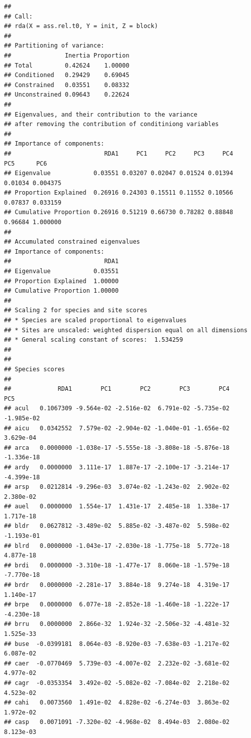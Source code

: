 \documentclass[
]{article}
\begin{document}
\begin{verbatim}
## 
## Call:
## rda(X = ass.rel.t0, Y = init, Z = block) 
## 
## Partitioning of variance:
##               Inertia Proportion
## Total         0.42624    1.00000
## Conditioned   0.29429    0.69045
## Constrained   0.03551    0.08332
## Unconstrained 0.09643    0.22624
## 
## Eigenvalues, and their contribution to the variance 
## after removing the contribution of conditiniong variables
## 
## Importance of components:
##                          RDA1     PC1     PC2     PC3     PC4     PC5      PC6
## Eigenvalue            0.03551 0.03207 0.02047 0.01524 0.01394 0.01034 0.004375
## Proportion Explained  0.26916 0.24303 0.15511 0.11552 0.10566 0.07837 0.033159
## Cumulative Proportion 0.26916 0.51219 0.66730 0.78282 0.88848 0.96684 1.000000
## 
## Accumulated constrained eigenvalues
## Importance of components:
##                          RDA1
## Eigenvalue            0.03551
## Proportion Explained  1.00000
## Cumulative Proportion 1.00000
## 
## Scaling 2 for species and site scores
## * Species are scaled proportional to eigenvalues
## * Sites are unscaled: weighted dispersion equal on all dimensions
## * General scaling constant of scores:  1.534259 
## 
## 
## Species scores
## 
##             RDA1        PC1        PC2        PC3        PC4        PC5
## acul   0.1067309 -9.564e-02 -2.516e-02  6.791e-02 -5.735e-02 -1.985e-02
## aicu   0.0342552  7.579e-02 -2.904e-02 -1.040e-01 -1.656e-02  3.629e-04
## arca   0.0000000 -1.038e-17 -5.555e-18 -3.808e-18 -5.876e-18 -1.336e-18
## ardy   0.0000000  3.111e-17  1.887e-17 -2.100e-17 -3.214e-17 -4.399e-18
## arsp   0.0212814 -9.296e-03  3.074e-02 -1.243e-02  2.902e-02  2.380e-02
## auel   0.0000000  1.554e-17  1.431e-17  2.485e-18  1.338e-17  1.717e-18
## bldr   0.0627812 -3.489e-02  5.885e-02 -3.487e-02  5.598e-02 -1.193e-01
## blrd   0.0000000 -1.043e-17 -2.030e-18 -1.775e-18  5.772e-18  4.877e-18
## brdi   0.0000000 -3.310e-18 -1.477e-17  8.060e-18 -1.579e-18 -7.770e-18
## brdr   0.0000000 -2.281e-17  3.884e-18  9.274e-18  4.319e-17  1.140e-17
## brpe   0.0000000  6.077e-18 -2.852e-18 -1.460e-18 -1.222e-17 -4.230e-18
## brru   0.0000000  2.866e-32  1.924e-32 -2.506e-32 -4.481e-32  1.525e-33
## buse  -0.0399181  8.064e-03 -8.920e-03 -7.638e-03 -1.217e-02  6.087e-02
## caer  -0.0770469  5.739e-03 -4.007e-02  2.232e-02 -3.681e-02  4.977e-02
## cagr  -0.0353354  3.492e-02 -5.082e-02 -7.084e-02  2.218e-02  4.523e-02
## cahi   0.0073560  1.491e-02  4.828e-02 -6.274e-03  3.863e-02  1.972e-02
## casp   0.0071091 -7.320e-02 -4.968e-02  8.494e-03  2.080e-02  8.123e-03

\end{verbatim}
\end{document}
